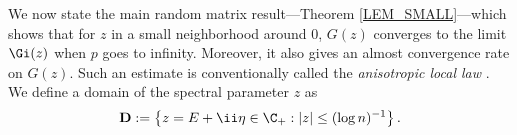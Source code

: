 \documentclass[aos,preprint]{imsart}
\begin{document}



We now state the main random matrix result---Theorem \ref{LEM_SMALL}---which shows that for $z$ in a small neighborhood around $0$, $G(z)$ converges to the limit $\Gi(z)$ when $p$ goes to infinity. Moreover, it also gives an almost convergence rate on $G(z)$. Such an estimate is conventionally called the {\it anisotropic local law} \cite{Anisotropic}. We define a domain of the spectral parameter $z$ as
\begin{equation}
\mathbf D:= \left\{z=E+ \ii \eta \in \C_+: |z|\le (\log n)^{-1} \right\}. \label{SSET1}
\end{equation}
\end{document}
